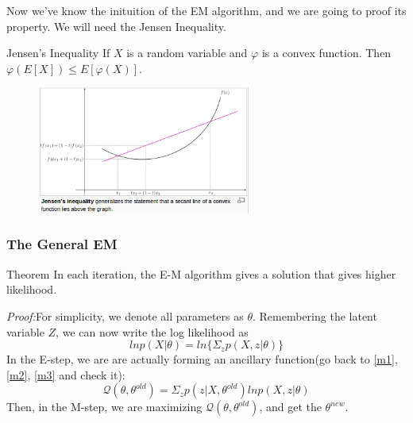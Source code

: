 \documentclass{beamer}
\begin{document}
\begin{frame}
Now we've know the inituition of the EM algorithm, and we are going to proof its property. We will need the Jensen Inequality.
\begin{block}{Jensen's Inequality}
If $X$ is a random variable and $\varphi$ is a convex function.
Then $\varphi(E[X]) \leq E[\varphi(X)]$.
\begin{figure}
\includegraphics[width=200pt]{jensen.png}
\end{figure}
\end{block}
\end{frame}

\begin{frame}
\frametitle{The General EM}
\begin{block}{Theorem}
In each iteration, the E-M algorithm gives a solution that gives higher likelihood.
\end{block}
\emph{Proof:}For simplicity, we denote all parameters as $\theta$.
Remembering the latent variable $Z$, we can now write the log likelihood as
\begin{equation}
lnp(X|\theta)=ln\{\Sigma_zp(X,z|\theta)\}
\end{equation}
In the E-step, we are are actually forming an ancillary function(go back to \ref{m1}, \ref{m2}, \ref{m3} and check it):
\begin{equation}
\mathcal{Q}(\theta,\theta^{old})=\Sigma_zp(z|X,\theta^{old})lnp(X,z|\theta)
\end{equation}
Then, in the M-step, we are maximizing $\mathcal{Q}(\theta,\theta^{old})$, and get the $\theta^{new}$.
\end{frame}
\end{document}
